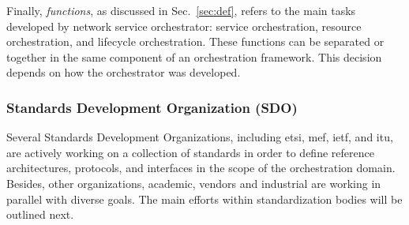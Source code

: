 Finally,  \textit{functions}, as discussed in Sec.~\ref{sec:def}, refers to the main tasks developed by network service orchestrator: service orchestration, resource orchestration, and lifecycle orchestration. These functions can be separated or together in the same component of an orchestration framework. This decision depends on how the orchestrator was developed.

\subsubsection{Standards Development Organization (SDO)}
Several Standards Development Organizations, including \gls{etsi}, \gls{mef}, \gls{ietf}, and \gls{itu}, are actively working on a collection of standards in order to define reference architectures, protocols, and interfaces in the scope of the orchestration domain. Besides, other organizations, academic, vendors and industrial are working in parallel with diverse goals. The main efforts within standardization bodies will be outlined next.